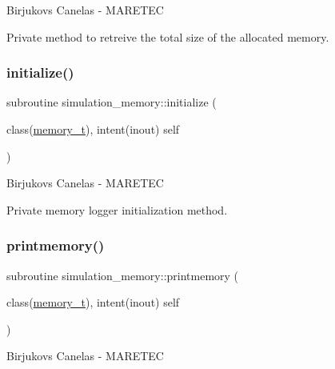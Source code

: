 Birjukovs Canelas -\/ M\+A\+R\+E\+T\+EC 

Private method to retreive the total size of the allocated memory. \mbox{\label{namespacesimulation__memory_a3b8f4e0766c90e6d6bd99e2fa49ea91b}} 
\subsubsection{\texorpdfstring{initialize()}{initialize()}}
{\footnotesize\ttfamily subroutine simulation\+\_\+memory\+::initialize (\begin{DoxyParamCaption}\item[{class(\mbox{\hyperlink{structsimulation__memory_1_1memory__t}{memory\+\_\+t}}), intent(inout)}]{self }\end{DoxyParamCaption})\hspace{0.3cm}{\ttfamily [private]}}



Birjukovs Canelas -\/ M\+A\+R\+E\+T\+EC 

Private memory logger initialization method. \mbox{\label{namespacesimulation__memory_a5827bef8479b809a453af147ceaa8c7c}} 
\subsubsection{\texorpdfstring{printmemory()}{printmemory()}}
{\footnotesize\ttfamily subroutine simulation\+\_\+memory\+::printmemory (\begin{DoxyParamCaption}\item[{class(\mbox{\hyperlink{structsimulation__memory_1_1memory__t}{memory\+\_\+t}}), intent(inout)}]{self }\end{DoxyParamCaption})\hspace{0.3cm}{\ttfamily [private]}}



Birjukovs Canelas -\/ M\+A\+R\+E\+T\+EC 

